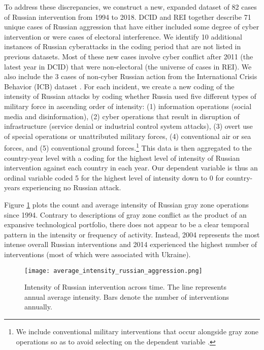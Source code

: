 \documentclass[11pt,letterpaper,pdftex,dvipsnames,table]{article}
\begin{document}
To address these discrepancies, we construct a new, expanded dataset of 82 cases of Russian intervention from 1994 to 2018. DCID and REI together describe 71 unique cases of Russian aggression that have either included some degree of cyber intervention or were cases of electoral interference. We identify 10 additional instances of Russian cyberattacks in the coding period that are not listed in previous datasets. Most of these new cases involve cyber conflict after 2011 (the latest year in DCID) that were non-electoral (the universe of cases in REI). We also include the 3 cases of non-cyber Russian action from the International Crisis Behavior (ICB) dataset \citep{brecher_studycrisis_1997}. For each incident, we create a new coding of the intensity of Russian attacks by coding whether Russia used five different types of military force in ascending order of intensity: (1) information operations (social media and disinformation), (2) cyber operations that result in disruption of infrastructure (service denial or industrial control system attacks), (3) overt use of special operations or unattributed military forces, (4) conventional air or sea forces, and (5) conventional ground forces.\footnote{We include conventional military interventions that occur alongside gray zone operations so as to avoid selecting on the dependent variable \citep{healey_escalationinversionother_2020, mares_georgia2008conflict_2020}.} This data is then aggregated to the country-year level with a coding for the highest level of intensity of Russian intervention against each country in each year. Our dependent variable is thus an ordinal variable coded 5 for the highest level of intensity down to 0 for country-years experiencing no Russian attack.

Figure \ref{fig:intensity} plots the count and average intensity of Russian gray zone operations since 1994. Contrary to descriptions of gray zone conflict as the product of an expansive technological portfolio, there does not appear to be a clear temporal pattern in the intensity or frequency of activity. Instead, 2004 represents the most intense overall Russian interventions and 2014 experienced the highest number of interventions (most of which were associated with Ukraine).

    \begin{figure}[H]
		\centering
		\texttt{[image: average\_intensity\_russian\_aggression.png]}
		\caption{Intensity of Russian intervention across time. The line represents annual average intensity. Bars denote the number of interventions annually.}
    \label{fig:intensity}
    \end{figure}
\end{document}
